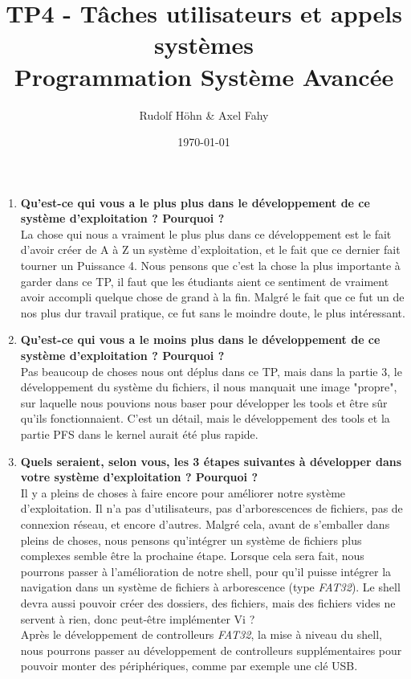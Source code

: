 \documentclass[a4paper]{article}
\title{TP4 - Tâches utilisateurs et appels systèmes\\Programmation Système Avancée}
\author{Rudolf Höhn \& Axel Fahy}
\date{\today}
\begin{document}
\maketitle

\begin{enumerate}
\item \textbf{Qu'est-ce qui vous a le plus plus dans le développement de ce système d'exploitation ? Pourquoi ?}\\
La chose qui nous a vraiment le plus plus dans ce développement est le fait d'avoir créer de A à Z un système d'exploitation, et le fait que ce dernier fait tourner un Puissance 4.
Nous pensons que c'est la chose la plus importante à garder dans ce TP, il faut que les étudiants aient ce sentiment de vraiment avoir accompli quelque chose de grand à la fin.
Malgré le fait que ce fut un de nos plus dur travail pratique, ce fut sans le moindre doute, le plus intéressant.
\item \textbf{Qu'est-ce qui vous a le moins plus dans le développement de ce système d'exploitation ? Pourquoi ?}\\
Pas beaucoup de choses nous ont déplus dans ce TP, mais dans la partie 3, le développement du système du fichiers, il nous manquait une image "propre", sur laquelle nous pouvions nous baser pour développer les tools et être sûr qu'ils fonctionnaient.
C'est un détail, mais le développement des tools et la partie PFS dans le kernel aurait été plus rapide.
\item \textbf{Quels seraient, selon vous, les 3 étapes suivantes à développer dans votre système d'exploitation ? Pourquoi ?}\\
Il y a pleins de choses à faire encore pour améliorer notre système d'exploitation. Il n'a pas d'utilisateurs, pas d'arborescences de fichiers, pas de connexion réseau, et encore d'autres.
Malgré cela, avant de s'emballer dans pleins de choses, nous pensons qu'intégrer un système de fichiers plus complexes semble être la prochaine étape.
Lorsque cela sera fait, nous pourrons passer à l'amélioration de notre shell, pour qu'il puisse intégrer la navigation dans un système de fichiers à arborescence (type \textit{FAT32}).
Le shell devra aussi pouvoir créer des dossiers, des fichiers, mais des fichiers vides ne servent à rien, donc peut-être implémenter Vi ? \\
Après le développement de controlleurs \textit{FAT32}, la mise à niveau du shell, nous pourrons passer au développement de controlleurs supplémentaires pour pouvoir monter des périphériques, comme par exemple une clé USB.\\

\end{enumerate}
\end{document}
